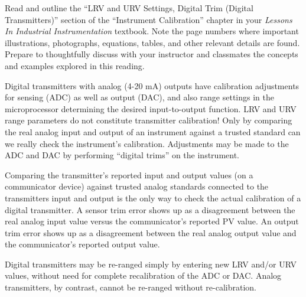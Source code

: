 

Read and outline the ``LRV and URV Settings, Digital Trim (Digital Transmitters)'' section of the ``Instrument Calibration'' chapter in your {\it Lessons In Industrial Instrumentation} textbook.  Note the page numbers where important illustrations, photographs, equations, tables, and other relevant details are found.  Prepare to thoughtfully discuss with your instructor and classmates the concepts and examples explored in this reading.














Digital transmitters with analog (4-20 mA) outputs have calibration adjustments for sensing (ADC) as well as output (DAC), and also range settings in the microprocessor determining the desired input-to-output function.  LRV and URV range parameters do not constitute transmitter calibration!  Only by comparing the real analog input and output of an instrument against a trusted standard can we really check the instrument's calibration.  Adjustments may be made to the ADC and DAC by performing ``digital trims'' on the instrument.  

\vskip 10pt

Comparing the transmitter's reported input and output values (on a communicator device) against trusted analog standards connected to the transmitters input and output is the only way to check the actual calibration of a digital transmitter.  A sensor trim error shows up as a disagreement between the real analog input value versus the communicator's reported PV value.  An output trim error shows up as a disagreement between the real analog output value and the communicator's reported output value.

\vskip 10pt

Digital transmitters may be re-ranged simply by entering new LRV and/or URV values, without need for complete recalibration of the ADC or DAC.  Analog transmitters, by contrast, cannot be re-ranged without re-calibration.









